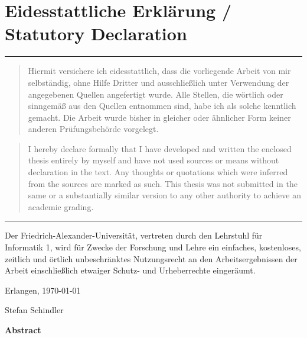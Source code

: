 \documentclass[10pt, a4paper, twoside=false, headsepline]{scrbook}
\renewcommand{\_}{\origunderscore\allowbreak}
\begin{document}
\pagestyle{scrplain}
\vspace*{\fill}
\section*{Eidesstattliche Erklärung / Statutory Declaration}

\vspace{0.1cm}
\noindent\hrule
\begin{quote}
Hiermit versichere ich eidesstattlich, dass die vorliegende Arbeit von mir
selbständig, ohne Hilfe Dritter und ausschließlich unter Verwendung der
angegebenen Quellen angefertigt wurde. Alle Stellen, die wörtlich oder
sinngemäß aus den Quellen entnommen sind, habe ich als solche kennt\-lich
gemacht. Die Arbeit wurde bisher in gleicher oder ähnlicher Form keiner anderen
Prüfungsbehörde vorgelegt.
\end{quote}

\begin{quote}
I hereby declare formally that I have developed and written the enclosed thesis
entirely by myself and have not used sources or means without declaration in
the text. Any thoughts or quotations which were inferred from the sources are
marked as such. This thesis was not submitted in the same or a substantially
similar version to any other authority to achieve an academic grading.
\end{quote}
\noindent\hrule

\vspace{0.5cm}
\noindent
Der Friedrich-Alexander-Universität, vertreten durch den Lehrstuhl
für Informatik 1, wird für Zwecke der Forschung und Lehre ein
einfaches, kostenloses, zeitlich und örtlich unbeschränktes
Nutzungsrecht an den Arbeitsergebnissen der Arbeit einschließlich
etwaiger Schutz- und Urheberrechte eingeräumt.

\vspace{0.5cm}
\noindent
Erlangen, \today

\vspace{1cm}
\begin{flushright}
Stefan Schindler \quad\null
\end{flushright}
\cleardoublepage

\vspace*{\fill}
\begin{center}
{\large\textbf{Abstract}}
\end{center}
\end{document}
